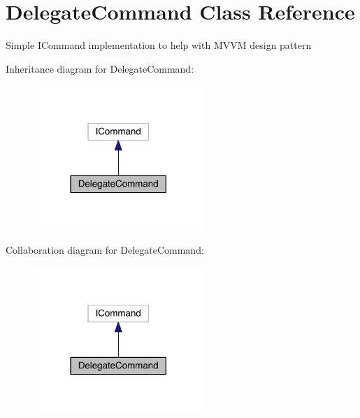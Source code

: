 \hypertarget{class_delegate_command}{\section{Delegate\+Command Class Reference}
\label{class_delegate_command}
}


Simple I\+Command implementation to help with M\+V\+V\+M design pattern  




Inheritance diagram for Delegate\+Command\+:
\nopagebreak
\begin{figure}[H]
\begin{center}
\leavevmode
\includegraphics[width=182pt]{class_delegate_command__inherit__graph}
\end{center}
\end{figure}


Collaboration diagram for Delegate\+Command\+:
\nopagebreak
\begin{figure}[H]
\begin{center}
\leavevmode
\includegraphics[width=182pt]{class_delegate_command__coll__graph}
\end{center}
\end{figure}
